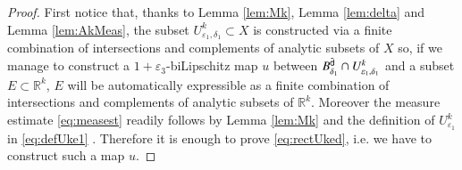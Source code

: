 \documentclass[11pt,reqno]{amsart}
\newcommand{\sfd}{{\sf d}}
\newcommand{\R}{\mathbb{R}}
\newcommand{\vare}{\varepsilon}
\theoremstyle{definition}
\theoremstyle{remark}
\theoremstyle{remark}
\theoremstyle{remark}
\theoremstyle{remark}
\theoremstyle{remark}
\theoremstyle{remark}
\theoremstyle{remark}
\begin{document}
\begin{proof}
First notice that, thanks to  Lemma \ref{lem:Mk}, Lemma \ref{lem:delta} and Lemma \ref{lem:AkMeas}, the subset  $U^k_{\vare_1, \delta_1}\subset X$ is constructed via a finite combination of intersections and complements of analytic subsets of $X$ so, if we manage to construct a  $1+\vare_3$-biLipschitz map $u$ between $B^{\tilde{\sfd}}_{\delta_1}\cap  U^k_{\vare_1, \delta_1}$ and   a subset $E\subset \R^k$, $E$ will be automatically expressible as a finite combination of intersections and complements of analytic subsets of $\R^k$. Moreover the measure estimate \eqref{eq:measest} readily follows by  Lemma \ref{lem:Mk} and the definition of $ U^{k}_{\vare_1}$ in \eqref{eq:defUke1} . Therefore it is enough to prove  \eqref{eq:rectUked}, i.e.  we have to construct such a map $u$.


\end{proof}
\end{document}
